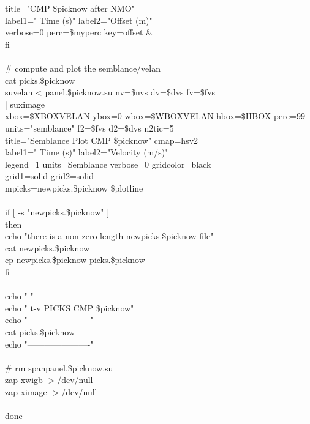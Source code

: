          title="CMP \$picknow after NMO" \ \\
         label1=" Time (s)" label2="Offset (m)" \ \\
         verbose=0 perc=\$myperc key=offset \& \\
    fi \\
 \\
    \# compute and plot the semblance/velan \\
    cat picks.\$picknow \\
    suvelan < panel.\$picknow.su nv=\$nvs dv=\$dvs fv=\$fvs \ \\
    | suximage \ \\
	xbox=\$XBOXVELAN ybox=0 wbox=\$WBOXVELAN hbox=\$HBOX perc=99 \ \\
        units="semblance" f2=\$fvs d2=\$dvs n2tic=5 \ \\
        title="Semblance Plot CMP \$picknow" cmap=hsv2 \      \\
       label1=" Time (s)" label2="Velocity (m/s)" \ \\
        legend=1 units=Semblance verbose=0 gridcolor=black \ \\
        grid1=solid grid2=solid \ \\
        mpicks=newpicks.\$picknow \$plotline \\
 \\
    if [ -s "newpicks.\$picknow" ] \\
    then \\
      echo "there is a non-zero length newpicks.\$picknow file" \\
      cat newpicks.\$picknow \\
      cp newpicks.\$picknow picks.\$picknow \\
    fi \\
 \\
    echo " " \\
    echo " t-v PICKS CMP \$picknow" \\
    echo "----------------------" \\
    cat picks.\$picknow \\
    echo "----------------------" \\
   \\
    \#  rm spanpanel.\$picknow.su \\
    zap xwigb $>$/dev/null \\
    zap ximage $>$/dev/null \\
 \\
  done \\
